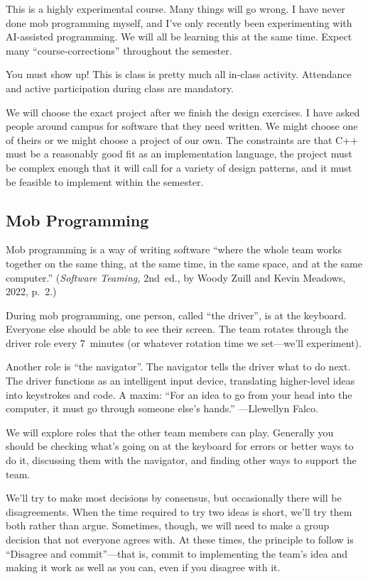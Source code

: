 \documentclass[12pt]{article}
\begin{document}
This is a highly experimental course. Many things will go wrong.
I have never done mob programming myself, and I've only recently been
experimenting with AI-assisted programming. We will all be learning this
at the same time.
Expect many ``course-corrections'' throughout the semester.

You must show up! This is class is pretty much all in-class activity.
Attendance and active participation during class are mandatory.

We will choose the exact project after we finish the design exercises.
I have asked people around campus for software that they need written.
We might choose one of theirs or we might choose a project of our own.
The constraints are that C++ must be a reasonably good fit as an
implementation language, the project must be complex enough that it
will call for a variety of design patterns, and it must be feasible
to implement within the semester.

\subsection*{Mob Programming}

Mob programming is a way of writing software ``where the whole team works
together on the same thing, at the same time, in the same space, and at
the same computer.'' (\emph{Software Teaming,} 2nd~ed., by Woody Zuill and
Kevin Meadows, 2022, p.~2.)

During mob programming, one person, called ``the driver'', is at the keyboard.
Everyone else should be able to see their screen. The team rotates through
the driver role every 7~minutes (or whatever rotation time we set---we'll
experiment).

Another role is ``the navigator''. The navigator tells the driver what to do
next. The driver functions as an intelligent input device, translating
higher-level ideas into keystrokes and code. A maxim: ``For an idea to go from
your head into the computer, it must go through someone else's hands.''
---Llewellyn Falco.

We will explore roles that the other team members can play. Generally you
should be checking what's going on at the keyboard for errors or better ways
to do it, discussing them with the navigator, and finding other ways to
support the team.

We'll try to make most decisions by consensus, but occasionally there will be
disagreements. When the time required to try two ideas is short, we'll try
them both rather than argue. Sometimes, though, we will need to make a group
decision that not everyone agrees with. At these times, the principle to
follow is ``Disagree and commit''---that is, commit to implementing the team's
idea and making it work as well as you can, even if you disagree with it.
\end{document}

